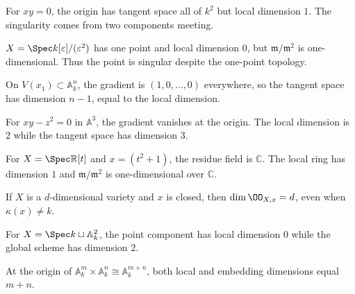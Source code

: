 \begin{example}\label{ex:vi32-09}
For $xy=0$, the origin has tangent space all of $k^2$ but local dimension $1$. The singularity comes from two components meeting.
\end{example}

\begin{example}\label{ex:vi32-10}
$X=\Spec k[\varepsilon]/(\varepsilon^2)$ has one point and local dimension $0$, but $\mathfrak m/\mathfrak m^2$ is one-dimensional. Thus the point is singular despite the one-point topology.
\end{example}

\begin{example}\label{ex:vi32-11}
On $V(x_1)\subset\mathbb A^n_k$, the gradient is $(1,0,\ldots,0)$ everywhere, so the tangent space has dimension $n-1$, equal to the local dimension.
\end{example}

\begin{example}\label{ex:vi32-12}
For $xy-z^2=0$ in $\mathbb A^3$, the gradient vanishes at the origin. The local dimension is $2$ while the tangent space has dimension $3$.
\end{example}

\begin{example}\label{ex:vi32-13}
For $X=\Spec\mathbb R[t]$ and $x=(t^2+1)$, the residue field is $\mathbb C$. The local ring has dimension $1$ and $\mathfrak m/\mathfrak m^2$ is one-dimensional over $\mathbb C$.
\end{example}

\begin{example}\label{ex:vi32-14}
If $X$ is a $d$-dimensional variety and $x$ is closed, then $\dim\OO_{X,x}=d$, even when $\kappa(x)\ne k$.
\end{example}

\begin{example}\label{ex:vi32-15}
For $X=\Spec k\sqcup\mathbb A^2_k$, the point component has local dimension $0$ while the global scheme has dimension $2$.
\end{example}

\begin{example}\label{ex:vi32-16}
At the origin of $\mathbb A^m_k\times\mathbb A^n_k\cong\mathbb A^{m+n}_k$, both local and embedding dimensions equal $m+n$.
\end{example}

